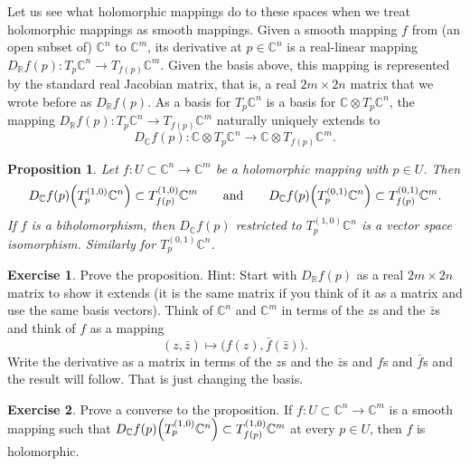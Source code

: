 \documentclass[12pt,openany]{book}
\newcommand{\C}{{\mathbb{C}}}
\newcommand{\R}{{\mathbb{R}}}
\theoremstyle{plain}
\newtheorem{prop}[thm]{Proposition}
\theoremstyle{remark}
\theoremstyle{definition}
\newenvironment{exbox}{%
    \def\FrameCommand{\vrule width 1pt \relax\hspace{10pt}}%
    \MakeFramed{\advance\hsize-\width\FrameRestore}%
}{%
    \endMakeFramed
}
\theoremstyle{exercise}
\newtheorem{exercise}{Exercise}[section]
\theoremstyle{example}
\begin{document}
Let us see what holomorphic mappings do to these spaces when we treat
holomorphic mappings as smooth mappings.
Given a smooth
mapping $f$ from (an open subset of) $\C^n$ to $\C^m$, its derivative at $p \in \C^n$
is a real-linear mapping $D_\R f(p) \colon T_p\C^n \to T_{f(p)} \C^m$.
Given the basis above, this mapping is represented by
the standard real Jacobian matrix, that is, a real $2m \times 2n$ matrix
that we wrote before as $D_\R f(p)$.
As a basis for $T_p\C^n$ is a basis for $\C \otimes T_p \C^n$, the mapping
$D_\R f(p) \colon T_p\C^n \to T_{f(p)} \C^m$ naturally uniquely
extends to
%
\begin{equation*}
D_\C f(p) \colon \C \otimes T_p\C^n \to \C \otimes T_{f(p)} \C^m .
\end{equation*}

\begin{prop} \label{prop:holvectmap}
Let $f \colon U \subset \C^n \to \C^m$ be a holomorphic mapping with
$p \in U$.
Then
\begin{equation*}
D_\C f(p)\Bigl(T_p^{(1,0)} \C^n\Bigr) \subset T_{f(p)}^{(1,0)} \C^m
\qquad \text{and} \qquad
D_\C f(p)\Bigl(T_p^{(0,1)} \C^n\Bigr) \subset T_{f(p)}^{(0,1)} \C^m .
\end{equation*}
If $f$ is a biholomorphism, then $D_\C f(p)$ restricted to $T_p^{(1,0)} \C^n$
is a vector space isomorphism.  Similarly for $T_p^{(0,1)} \C^n$.
\end{prop}

\begin{exbox}
\begin{exercise}
Prove the proposition.
Hint: Start with $D_\R f(p)$ as a real $2m \times 2n$ matrix to show it
extends (it is the same matrix if you think of it as a matrix
and use the same basis vectors).
Think of $\C^n$ and $\C^m$ in terms of the $z$s and the
$\bar{z}$s and think of $f$ as a mapping
\begin{equation*}
(z,\bar{z}) \mapsto \bigl( f(z) , \bar{f}(\bar{z}) \bigr) .
\end{equation*}
Write the derivative as a matrix in terms of the $z$s and the $\bar{z}$s
and $f$s and $\bar{f}$s and the result will follow.  That is just changing
the basis.
\end{exercise}

\begin{exercise}
Prove a converse to the proposition.  If $f \colon U \subset \C^n \to \C^m$
is a smooth mapping such that
$D_\C f(p)\Bigl(T_p^{(1,0)} \C^n\Bigr) \subset T_{f(p)}^{(1,0)} \C^m$
at every $p \in U$, then $f$ is holomorphic.
\end{exercise}
\end{exbox}
\end{document}
